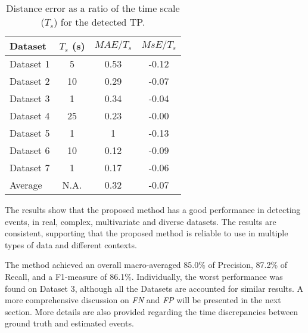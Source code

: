 \begin{table}
	\begin{center}
        \begin{tabular}{lccc}
            \toprule
			Dataset & $T_s$ (s) & $MAE/T_s$ & $MsE/T_s$ \\
			\toprule
			Dataset 1 & 5 & 0.53 & -0.12 \\
			Dataset 2 & 10 & 0.29 & -0.07 \\
			Dataset 3 & 1 & 0.34 & -0.04 \\
			Dataset 4 & 25 & 0.23 & -0.00 \\
			Dataset 5 & 1 & 1 & -0.13 \\
			Dataset 6 & 10 & 0.12 & -0.09 \\
			Dataset 7 & 1 & 0.17 & -0.06 \\
			\midrule
			Average & N.A. & 0.32 & -0.07 \\
			\bottomrule
		\end{tabular}
	\end{center}
	\caption{Distance error as a ratio of the time scale ($T_s$) for the detected TP.}
	\label{tab:overall_cpd_dist}
\end{table}

The results show that the proposed method has a good performance in detecting events, in real, complex, multivariate and diverse datasets. The results are consistent, supporting that the proposed method is reliable to use in multiple types of data and different contexts.
\par
The method achieved an overall macro-averaged 85.0\% of Precision, 87.2\% of Recall, and a F1-measure of 86.1\%. Individually, the worst performance was found on Dataset 3, although all the Datasets are accounted for similar results. A more comprehensive discussion on \textit{FN} and \textit{FP} will be presented in the next section. More details are also provided regarding the time discrepancies between ground truth and estimated events.

